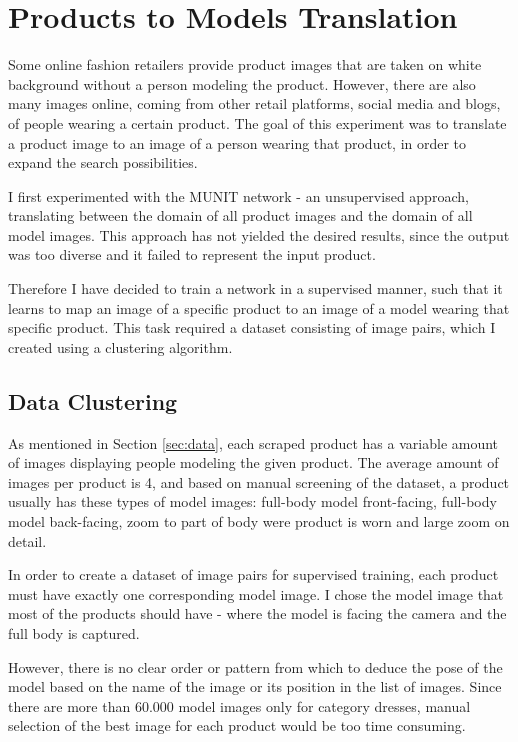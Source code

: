 \documentclass[12pt]{report}
\begin{document}
\pagebreak
\section{Products to Models Translation}
Some online fashion retailers provide product images that are taken on white background without a person modeling the product. However, there are also many images online, coming from other retail platforms, social media and blogs, of people wearing a certain product. The goal of this experiment was to translate a product image to an image of a person wearing that product, in order to expand the search possibilities.

I first experimented with the MUNIT network - an unsupervised approach, translating between the domain of all product images and the domain of all model images. This approach has not yielded the desired results, since the output was too diverse and it failed to represent the input product.

Therefore I have decided to train a network in a supervised manner, such that it learns to map an image of a specific product to an image of a model wearing that specific product. This task required a dataset consisting of image pairs, which I created using a clustering algorithm.

\subsection{Data Clustering}
As mentioned in Section \ref{sec:data}, each scraped product has a variable amount of images displaying people modeling the given product. The average amount of images per product is 4, and based on manual screening of the dataset, a product usually has these types of model images: full-body model front-facing, full-body model back-facing, zoom to part of body were product is worn and large zoom on detail.

In order to create a dataset of image pairs for supervised training, each product must have exactly one corresponding model image. I chose the model image that most of the products should have - where the model is facing the camera and the full body is captured. 

However, there is no clear order or pattern from which to deduce the pose of the model based on the name of the image or its position in the list of images. Since there are more than 60.000 model images only for category dresses, manual selection of the best image for each product would be too time consuming.
\end{document}
